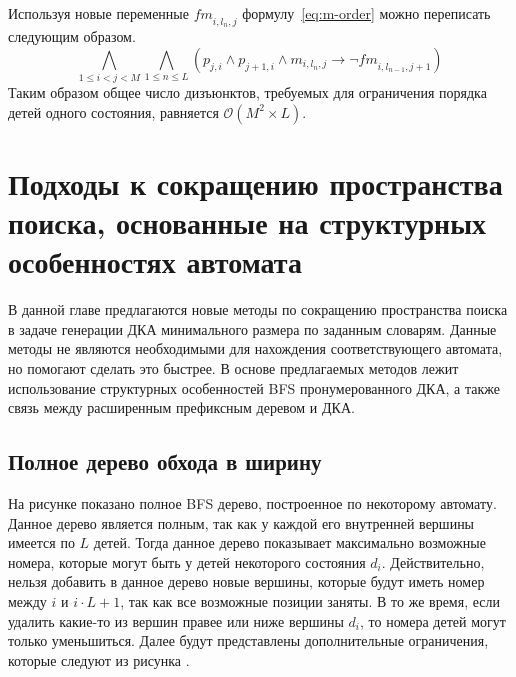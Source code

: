 Используя новые переменные $\mathit{fm}_{i,l_{n},j}$ формулу~\eqref{eq:m-order} можно переписать следующим образом.
%
\begin{equation}
\label{eq:m-order-tight}
  \bigwedge_{1 \leq i < j < M} \bigwedge_{1 \leq n \leq L} \left(p_{j,i} \wedge p_{j + 1, i} \wedge m_{i,l_{n}, j} \rightarrow \neg \mathit{fm}_{i, l_{n - 1}, j + 1}\right)
\end{equation}
%
Таким образом общее число дизъюнктов, требуемых для ограничения порядка детей одного состояния, равняется $\mathcal{O}\left(M^{2} \times L\right)$. 


\section{Подходы к сокращению пространства поиска, основанные на структурных особенностях автомата} 
\label{sec:space:pruning}

В данной главе предлагаются новые методы по сокращению пространства поиска в задаче генерации ДКА минимального размера по заданным словарям. 
Данные методы не являются необходимыми для нахождения соответствующего автомата, но помогают сделать это быстрее.
В основе предлагаемых методов лежит использование структурных особенностей BFS пронумерованного ДКА, а также связь между расширенным префиксным деревом и ДКА.

\subsection{Полное дерево обхода в ширину}
\label{sec:space:pruning:bfs-tree}


На рисунке  показано полное BFS дерево, построенное по некоторому автомату.
Данное дерево является полным, так как у каждой его внутренней вершины имеется по $L$ детей.
Тогда данное дерево показывает максимально возможные номера, которые могут быть у детей некоторого состояния $d_{i}$.
Действительно, нельзя добавить в данное дерево новые вершины, которые будут иметь номер между $i$ и $i \cdot L + 1$, так как все возможные позиции заняты.
В то же время, если удалить какие-то из вершин правее или ниже вершины $d_{i}$, то номера детей могут только уменьшиться.
Далее будут представлены дополнительные ограничения, которые следуют из рисунка .

